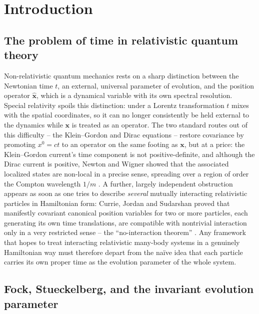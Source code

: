\documentclass[11pt]{article}
\begin{document}
\clearpage

\section{Introduction}

\subsection{The problem of time in relativistic quantum theory}

Non-relativistic quantum mechanics rests on a sharp distinction between the
Newtonian time $t$, an external, universal parameter of evolution, and the
position operator $\hat{\bm x}$, which is a dynamical variable with its own
spectral resolution. Special relativity spoils this distinction: under a Lorentz
transformation $t$ mixes with the spatial coordinates, so it can no longer
consistently be held external to the dynamics while $\bm x$ is treated as an
operator. The two standard routes out of this difficulty -- the Klein--Gordon and
Dirac equations -- restore covariance by promoting $x^0=ct$ to an operator on the
same footing as $\bm x$, but at a price: the Klein--Gordon current's time
component is not positive-definite, and although the Dirac current is positive,
Newton and Wigner showed that the associated localized states are non-local in a
precise sense, spreading over a region of order the Compton wavelength
$1/m$ \cite{NewtonWigner1949}. A further, largely independent obstruction
appears as soon as one tries to describe \emph{several} mutually interacting
relativistic particles in Hamiltonian form: Currie, Jordan and Sudarshan proved
that manifestly covariant canonical position variables for two or more particles,
each generating its own time translations, are compatible with nontrivial
interaction only in a very restricted sense -- the ``no-interaction theorem''
\cite{CurrieJordanSudarshan1963}. Any framework that hopes to treat interacting
relativistic many-body systems in a genuinely Hamiltonian way must therefore
depart from the na\"ive idea that each particle carries its own proper time as
the evolution parameter of the whole system.

\subsection{Fock, Stueckelberg, and the invariant evolution parameter}
\end{document}

